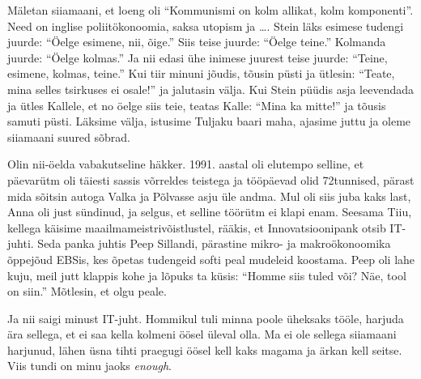 Mäletan siiamaani, et loeng oli \enquote{Kommunismi on kolm allikat, kolm 
komponenti}. Need on inglise poliitökonoomia, saksa utopism ja \ldots{}. Stein läks esimese tudengi juurde: 
\enquote{Öelge esimene, nii, õige.} Siis teise juurde: \enquote{Öelge teine.} 
Kolmanda juurde: \enquote{Öelge kolmas.} Ja nii edasi ühe inimese juurest teise juurde: 
\enquote{Teine, esimene, kolmas, teine.} Kui tiir minuni jõudis, tõusin püsti 
ja ütlesin: \enquote{Teate, mina selles tsirkuses ei osale!} ja jalutasin välja. 
Kui Stein püüdis asja leevendada ja ütles Kallele, et no öelge siis 
teie, teatas Kalle: \enquote{Mina ka mitte!} ja tõusis samuti püsti. Läksime 
välja, istusime Tuljaku baari maha, ajasime juttu ja oleme siiamaani suured 
sõbrad.


Olin nii-öelda vabakutseline häkker. 1991. aastal oli 
elutempo selline, et päevarütm oli täiesti sassis võrreldes teistega ja 
tööpäevad olid 72tunnised, pärast mida sõitsin autoga Valka ja Põlvasse asju 
üle andma. Mul oli siis juba kaks last, Anna oli just sündinud, ja selgus, et 
selline töörütm ei klapi enam. Seesama Tiiu, 
kellega käisime maailmameistrivõistlustel, rääkis, et 
Innovatsioonipank otsib IT-juhti. Seda panka juhtis Peep 
Sillandi, pärastine mikro- ja makroökonoomika 
õppejõud EBSis, kes õpetas tudengeid softi peal mudeleid koostama. 
Peep oli lahe kuju, meil jutt klappis kohe ja lõpuks ta küsis: \enquote{Homme siis tuled 
või? Näe, tool on siin.} Mõtlesin, et olgu peale. 

Ja nii saigi minust IT-juht. Hommikul tuli minna poole üheksaks tööle, harjuda ära
sellega, et ei saa kella kolmeni öösel üleval olla. Ma ei ole sellega siiamaani 
harjunud, lähen üsna tihti praegugi öösel kell kaks magama ja ärkan kell 
seitse. Viis tundi on minu jaoks \emph{enough}. 

